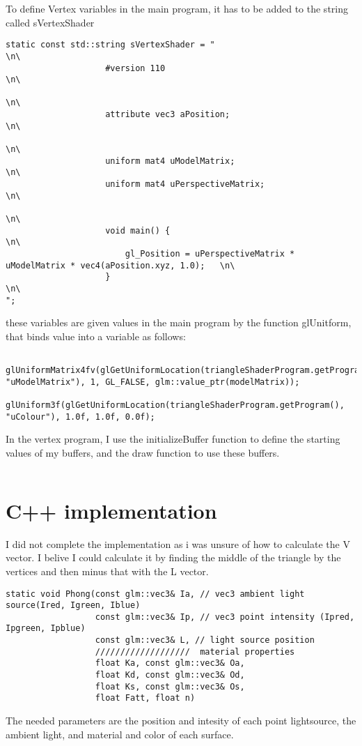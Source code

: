 \documentclass{article}
\begin{document}
To define Vertex variables in the main program, it has to be
added to the string called sVertexShader
\begin{verbatim}
static const std::string sVertexShader = "															  \n\
					#version 110                                                                      \n\
																									  \n\
					attribute vec3 aPosition;														  \n\
																									  \n\
					uniform mat4 uModelMatrix;														  \n\
					uniform mat4 uPerspectiveMatrix;												  \n\
																									  \n\
					void main() {                                                                     \n\
						gl_Position = uPerspectiveMatrix * uModelMatrix * vec4(aPosition.xyz, 1.0);	  \n\
					}																				  \n\
";
\end{verbatim}
these variables are given values in the main program by the function
glUnitform, that binds value into a variable as follows:
\begin{verbatim}
	glUniformMatrix4fv(glGetUniformLocation(triangleShaderProgram.getProgram(), "uModelMatrix"), 1, GL_FALSE, glm::value_ptr(modelMatrix));
	glUniform3f(glGetUniformLocation(triangleShaderProgram.getProgram(), "uColour"), 1.0f, 1.0f, 0.0f);
\end{verbatim}

In the vertex program, I use the initializeBuffer function to define the starting values
of my buffers, and the draw function to use these buffers.

\begin{verbatim}

\end{verbatim}

\section{C++ implementation}
I did not complete the implementation as i was unsure of how to calculate the V vector.
I belive I could calculate it by finding the middle of the triangle by the vertices and
then minus that with the L vector. 

\begin{verbatim}
static void Phong(const glm::vec3& Ia, // vec3 ambient light source(Ired, Igreen, Iblue) 
                  const glm::vec3& Ip, // vec3 point intensity (Ipred, Ipgreen, Ipblue)
                  const glm::vec3& L, // light source position
                  ///////////////////  material properties
                  float Ka, const glm::vec3& Oa, 
                  float Kd, const glm::vec3& Od, 
                  float Ks, const glm::vec3& Os, 
                  float Fatt, float n) 
\end{verbatim}
The needed parameters are the position and intesity of each point lightsource, the ambient light,
and material and color of each surface. 
\end{document}
